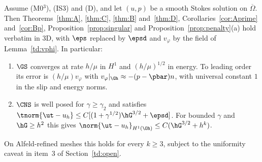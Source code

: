 \begin{theorem}\label{td:main}
Assume (M0$^3$), (IS3) and (D), and let $(u,p)$ be a smooth Stokes solution on $\overline\Omega$. Then Theorems~\ref{thm:A}, \ref{thm:C}, \ref{thm:B} and~\ref{thm:D}, Corollaries~\ref{cor:Aprime} and~\ref{cor:Bp}, Proposition~\ref{prop:singular} and Proposition~\ref{prop:penalty}(a) hold verbatim in 3D, with $\eps$ replaced by $\epsd$ and $v_\varphi$ by the field of Lemma~\ref{td:vphi}. In particular:
\begin{enumerate}[label=(\roman*)]
\item $\GS$ converges at rate $h/\mu$ in $H^1$ and $(h/\mu)^{1/2}$ in energy. To leading order its error is $(h/\mu)v_\varphi$ with $v_\varphi|_{\Gh}\approx-(p-\pbar)n$, with universal constant $1$ in the slip and energy norms.
\item $\CNS$ is well posed for $\gamma\ge\gamma_2$ and satisfies $\tnorm{\ut-u_h}\le C[(1+\gamma^{1/2})\hG^{3/2}+\epsd]$. For bounded $\gamma$ and $\hG\ge h^2$ this gives $\norm{\ut-u_h}_{H^1(\Oh)}\le C(\hG^{3/2}+h^k)$.
\end{enumerate}
On Alfeld-refined meshes this holds for every $k\ge3$, subject to the uniformity caveat in item~3 of Section~\ref{td:open}.
\end{theorem}

